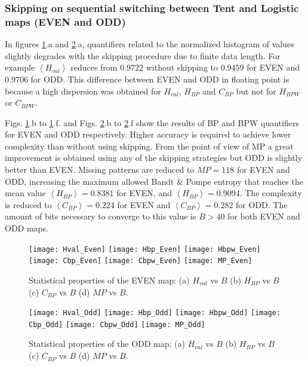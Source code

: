 \subsubsection{Skipping on sequential switching between Tent and Logistic maps (EVEN and ODD)} \label{sssec:skipp}

In figures \ref{fig:EVEN_QuantiB}.a and \ref{fig:ODD_QuantiB}.a, quantifiers related to the normalized histogram of values slightly degrades with the skipping procedure due to finite data length.
For example $\left\langle H_{val}\right\rangle $ reduces from $0.9722$ without skipping to $0.9459$ for EVEN and $0.9706$ for ODD. 
This difference between EVEN and ODD in floating point is because a high dispersion was obtained for $H_{val}$, $H_{BP}$ and $C_{BP}$ but not for $H_{BPW}$ or $C_{BPW}$.

Figs. \ref{fig:EVEN_QuantiB}.b to \ref{fig:EVEN_QuantiB}.f. and Figs. \ref{fig:ODD_QuantiB}.b to \ref{fig:ODD_QuantiB}.f show the results of BP and BPW quantifiers for EVEN and ODD respectively.
Higher accuracy is required to achieve lower complexity than without using skipping.
From the point of view of MP a great improvement is obtained using any of the skipping strategies but ODD is slightly better than EVEN.
Missing patterns are reduced to $MP = 118$ for EVEN and ODD, increasing the maximum allowed Bandt \& Pompe entropy that reaches the mean value $\left\langle H_{BP}\right\rangle  = 0.8381$ for EVEN, and $\left\langle H_{BP}\right\rangle  = 0.9094$.
The complexity is reduced to $\left\langle C_{BP}\right\rangle = 0.224$ for EVEN and $\left\langle C_{BP}\right\rangle = 0.282$ for ODD.
The amount of bits necessary to converge to this value is $B>40$ for both EVEN and ODD maps.

\begin{figure}
	\texttt{[image: Hval\_Even]}
	\texttt{[image: Hbp\_Even]}
	\texttt{[image: Hbpw\_Even]}
	\texttt{[image: Cbp\_Even]}
	\texttt{[image: Cbpw\_Even]}
	\texttt{[image: MP\_Even]}
	\caption{Statistical properties of the EVEN map: (a) $H_{val}$ vs $B$ (b) $H_{BP}$ vs $B$ (c) $C_{BP}$ vs $B$ (d) $MP$ vs $B$.}
	\label{fig:EVEN_QuantiB}
\end{figure}

\begin{figure}
	\texttt{[image: Hval\_Odd]}
	\texttt{[image: Hbp\_Odd]}
	\texttt{[image: Hbpw\_Odd]}
	\texttt{[image: Cbp\_Odd]}
	\texttt{[image: Cbpw\_Odd]}
	\texttt{[image: MP\_Odd]}
	\caption{Statistical properties of the ODD map: (a) $H_{val}$ vs $B$ (b) $H_{BP}$ vs $B$ (c) $C_{BP}$ vs $B$ (d) $MP$ vs $B$.}
	\label{fig:ODD_QuantiB}
	\end{figure}

